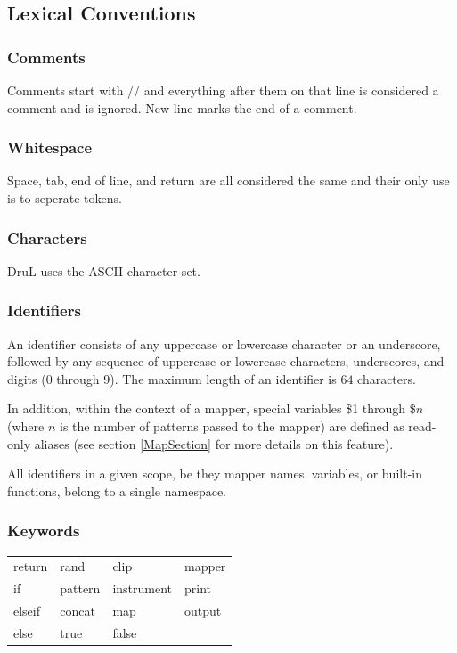 \documentclass[11pt,twoside]{article}
\begin{document}
\subsection{Lexical Conventions}

\subsubsection{Comments}

Comments start with // and everything after them on that line
is considered a comment and is ignored. New line marks the end
of a comment.

\subsubsection{Whitespace}

Space, tab, end of line, and return are all considered the same 
and their only use is to seperate tokens.

\subsubsection{Characters}

DruL uses the ASCII character set.

\subsubsection{Identifiers}

An identifier consists of any uppercase or lowercase character
or an underscore, followed by any sequence of uppercase or lowercase characters,
underscores, and digits ($0$ through $9$). The maximum length of an identifier
is $64$ characters.

In addition, within the context of a mapper, special variables \$1 through \$$n$ (where $n$ is the number of patterns passed to the mapper) are defined as read-only aliases (see section \ref{MapSection} for more details on this feature).

All identifiers in a given scope, be they mapper names, variables, or built-in functions, belong to a single namespace.

\subsubsection{Keywords}

\begin{table}[htb]
\begin{center} 
\begin{tabular}{llll} 
  return   & rand    & clip       & mapper \\
  if     & pattern & instrument & print  \\
  elseif & concat  & map     & output \\
  else   & true    & false &
\end{tabular}
\label{tab:keywords}
\end{center} 
\end{table}
\end{document}
